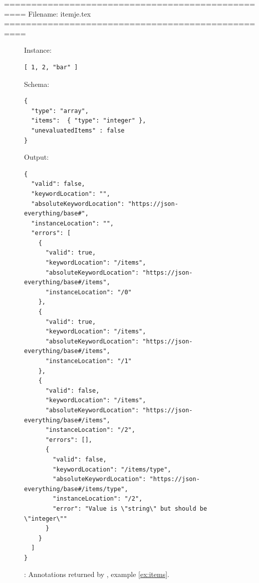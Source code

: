==================================================
Filename: itemje.tex
==================================================
\begin{figure}
\small

Instance:
\begin{querybox}{}
\begin{lstlisting}[style=querynonumbers]
[ 1, 2, "bar" ]
\end{lstlisting}
\end{querybox}

Schema:
\begin{querybox}{}
\begin{lstlisting}[style=query]
{
  "type": "array",
  "items":  { "type": "integer" }, 
  "unevaluatedItems" : false
}
\end{lstlisting}
\end{querybox}

Output:
\begin{querybox}{}
\begin{lstlisting}[style=query]
{
  "valid": false,
  "keywordLocation": "",
  "absoluteKeywordLocation": "https://json-everything/base#",
  "instanceLocation": "",
  "errors": [
    {
      "valid": true,
      "keywordLocation": "/items",
      "absoluteKeywordLocation": "https://json-everything/base#/items",
      "instanceLocation": "/0"
    },
    {
      "valid": true,
      "keywordLocation": "/items",
      "absoluteKeywordLocation": "https://json-everything/base#/items",
      "instanceLocation": "/1"
    },
    {
      "valid": false,
      "keywordLocation": "/items",
      "absoluteKeywordLocation": "https://json-everything/base#/items",
      "instanceLocation": "/2",
      "errors": [],
      {
        "valid": false,
        "keywordLocation": "/items/type",
        "absoluteKeywordLocation": "https://json-everything/base#/items/type",
        "instanceLocation": "/2",
        "error": "Value is \"string\" but should be \"integer\""
      }
    }
  ]
}
\end{lstlisting}
\end{querybox}

\caption{{\qits}: Annotations returned by {\JE}, example \ref{ex:items}.}
\label{fig:itemje}
\end{figure}



